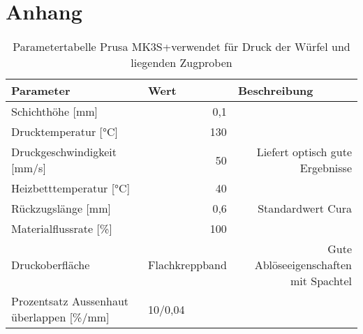 \chapter{Anhang}
\label{Anhang}
\begin{table}[htbp]
    \centering
    \caption{Parametertabelle Prusa MK3S+\newline verwendet für Druck der Würfel und liegenden Zugproben}
      \begin{tabular}{llr}
      \toprule
      \textbf{Parameter} & \textbf{Wert} & \multicolumn{1}{l}{\textbf{Beschreibung}} \\
      \midrule
      Schichthöhe [mm] & \multicolumn{1}{r}{0,1} &  \\
      Drucktemperatur [°C] & \multicolumn{1}{r}{130} &  \\
      Druckgeschwindigkeit [mm/s] & \multicolumn{1}{r}{50} & \multicolumn{1}{p{12.555em}}{Liefert optisch gute Ergebnisse} \\
      Heizbetttemperatur [°C] & \multicolumn{1}{r}{40} &  \\
      Rückzugslänge [mm] & \multicolumn{1}{r}{0,6} & \multicolumn{1}{p{12.555em}}{Standardwert Cura} \\
      Materialflussrate [\%] & \multicolumn{1}{r}{100} &  \\
      Druckoberfläche & Flachkreppband & \multicolumn{1}{p{12.555em}}{Gute Ablöseeigenschaften mit Spachtel} \\
      Prozentsatz Aussenhaut überlappen [\%/mm] & 10/0,04 &  \\
      \bottomrule
      \end{tabular}%
    \label{Würfelparameter}%
  \end{table}


